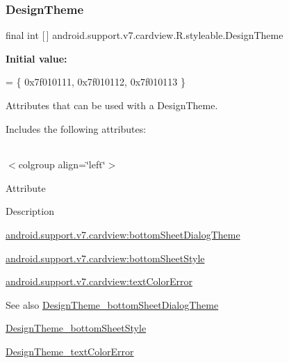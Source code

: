 \subsubsection{\texorpdfstring{Design\+Theme}{DesignTheme}}
{\footnotesize\ttfamily final int \mbox{[}$\,$\mbox{]} android.\+support.\+v7.\+cardview.\+R.\+styleable.\+Design\+Theme\hspace{0.3cm}{\ttfamily [static]}}

{\bfseries Initial value\+:}
\begin{DoxyCode}
= \{
            0x7f010111, 0x7f010112, 0x7f010113
        \}
\end{DoxyCode}
Attributes that can be used with a Design\+Theme. 

Includes the following attributes\+:

\tabulinesep=1mm
\begin{longtabu} spread 0pt [c]{*{0}{|X[-1]}|}
\hline
\end{longtabu}
$<$colgroup align=\char`\"{}left\char`\"{}$>$ 

Attribute

Description 

{\ttfamily \hyperlink{classandroid_1_1support_1_1v7_1_1cardview_1_1R_1_1styleable_a757520d29ac651f85eab4b6503097f00}{android.\+support.\+v7.\+cardview\+:bottom\+Sheet\+Dialog\+Theme}}

{\ttfamily \hyperlink{classandroid_1_1support_1_1v7_1_1cardview_1_1R_1_1styleable_a836f93ed42ba933abdd786be29d4126e}{android.\+support.\+v7.\+cardview\+:bottom\+Sheet\+Style}}

{\ttfamily \hyperlink{classandroid_1_1support_1_1v7_1_1cardview_1_1R_1_1styleable_a4f7faa1dd10a899663c85c1c21cfe8a2}{android.\+support.\+v7.\+cardview\+:text\+Color\+Error}}

\begin{DoxySeeAlso}{See also}
\hyperlink{classandroid_1_1support_1_1v7_1_1cardview_1_1R_1_1styleable_a757520d29ac651f85eab4b6503097f00}{Design\+Theme\+\_\+bottom\+Sheet\+Dialog\+Theme} 

\hyperlink{classandroid_1_1support_1_1v7_1_1cardview_1_1R_1_1styleable_a836f93ed42ba933abdd786be29d4126e}{Design\+Theme\+\_\+bottom\+Sheet\+Style} 

\hyperlink{classandroid_1_1support_1_1v7_1_1cardview_1_1R_1_1styleable_a4f7faa1dd10a899663c85c1c21cfe8a2}{Design\+Theme\+\_\+text\+Color\+Error} 
\end{DoxySeeAlso}
\mbox{\label{classandroid_1_1support_1_1v7_1_1cardview_1_1R_1_1styleable_a757520d29ac651f85eab4b6503097f00}} 
